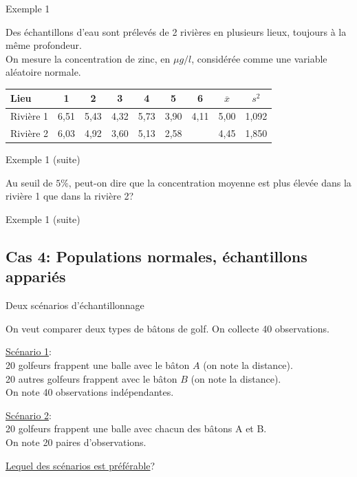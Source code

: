 \documentclass{BeamerTemplate}
\begin{document}
\begin{frame}[t]{Exemple 1}

{\small
Des échantillons d'eau sont prélevés de 2 rivières en plusieurs lieux, toujours à la même profondeur. \\
On  mesure la concentration de zinc, en $\mu g/l$, considérée comme une variable aléatoire normale.


\begin{tabular}{|l|cccccc|c|c|}
\hline
Lieu & 1 & 2 & 3 & 4 & 5 & 6 & $\overline x$& $s^2$\\
\hline
Rivière 1 & 6,51 & 5,43 & 4,32 & 5,73 & 3,90 & 4,11 & 5,00&1,092\\
Rivière 2 & 6,03 & 4,92 & 3,60 & 5,13 & 2,58 &  & 4,45&1,850\\
\hline
\end{tabular}

}

\end{frame}


\begin{frame}[t]{Exemple 1 (suite)}

Au seuil de $5 \%$, peut-on dire que la concentration moyenne est plus élevée dans la rivière 1 que dans la rivière 2?

\end{frame}
\begin{frame}[t]{Exemple 1 (suite)}

\end{frame}

\subsection{Cas 4: Populations normales, échantillons appariés}\label{sec:ttestapp}

\begin{frame}[t]{Deux scénarios d'échantillonnage}

On veut comparer deux types de  bâtons de golf. On collecte 40 observations.
\vspace{2mm}

\medskip
\small

\underline{Scénario 1}:\\
20 golfeurs frappent une balle avec le bâton $A$ (on note la distance).\\%
20 autres golfeurs frappent avec le bâton $B$ (on note la distance).\\
On note 40 observations indépendantes.

\medskip
\underline{Scénario 2}:\\
20 golfeurs  frappent une balle avec chacun des bâtons A et B. \\
On note 20 paires d'observations.%

\medskip
\underline{Lequel des scénarios est préférable}?

\end{frame}
\end{document}
